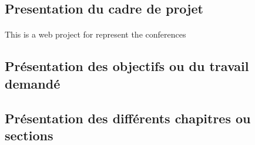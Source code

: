 \documentclass[../main.tex]{subfiles}
\begin{document}
	\subsection{Presentation du cadre de projet}
	\paragraph{}
	This is a web project for represent the conferences
	\subsection{Présentation des objectifs ou du travail demandé}
	\subsection{Présentation des différents chapitres ou sections}
\end{document}
